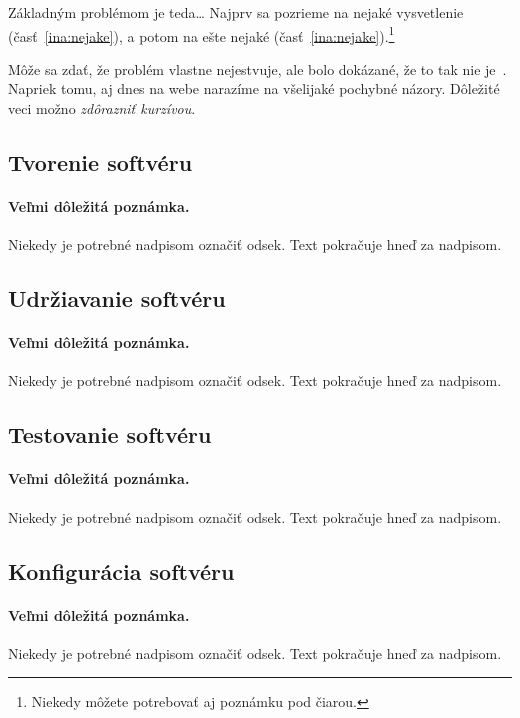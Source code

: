 \documentclass[10pt,twoside,slovak,a4paper]{article}
\begin{document}
Základným problémom je teda\ldots{} Najprv sa pozrieme na nejaké vysvetlenie (časť~\ref{ina:nejake}), a potom na ešte nejaké (časť~\ref{ina:nejake}).\footnote{Niekedy môžete potrebovať aj poznámku pod čiarou.}

Môže sa zdať, že problém vlastne nejestvuje\cite{Coplien:MPD}, ale bolo dokázané, že to tak nie je~\cite{Czarnecki:Staged, Czarnecki:Progress}. Napriek tomu, aj dnes na webe narazíme na všelijaké pochybné názory\cite{PLP-Framework}. Dôležité veci možno \emph{zdôrazniť kurzívou}.


\subsection{Tvorenie softvéru} \label{ina:Tvorenie}

\paragraph{Veľmi dôležitá poznámka.}
Niekedy je potrebné nadpisom označiť odsek. Text pokračuje hneď za nadpisom.


\subsection{Udržiavanie softvéru} \label{ina:Udrziavanie}

\paragraph{Veľmi dôležitá poznámka.}
Niekedy je potrebné nadpisom označiť odsek. Text pokračuje hneď za nadpisom.

\subsection{Testovanie softvéru} \label{ina:Testovanie}

\paragraph{Veľmi dôležitá poznámka.}
Niekedy je potrebné nadpisom označiť odsek. Text pokračuje hneď za nadpisom.

\subsection{Konfigurácia softvéru} \label{ina:Konfiguracia}

\paragraph{Veľmi dôležitá poznámka.}
Niekedy je potrebné nadpisom označiť odsek. Text pokračuje hneď za nadpisom.
\end{document}

